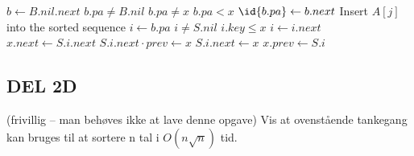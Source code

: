 \documentclass[a4paper]{article}
\begin{document}
\begin{codebox}
\li $b \gets B.nil.next$  
\li \While $b.pa \neq B.nil$ \And $b.pa \neq x$ \And $b.pa < x$  
\li \Do
$\id{b.pa} \gets b.next$
\li \Comment Insert $A[j]$ into the sorted sequence
\End
\li $i \gets b.pa$
\li \While $i \neq S.nil$ \And $i.key \le x$
\li \Do
$i \gets i.next$ 
\End
\li $x.next \gets S.i.next$
\li $S.i.next \cdot prev \gets x$
\li $S.i.next \gets x$
\li $x.prev \gets S.i$
\End
\end{codebox}

\subsection{DEL 2D}
(frivillig – man behøves ikke at lave denne opgave) Vis at ovenstående tankegang kan bruges til at sortere n tal i $O(n\sqrt{n})$ tid.
\end{document}
